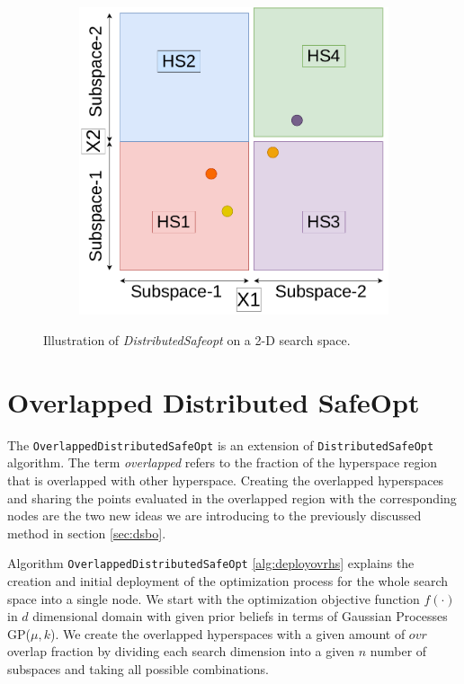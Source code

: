 \begin{figure}[H]
\begin{subfigure}{0.45\textwidth}
		\caption{}
		\label{fig:dsbo-f}
	\end{subfigure}
	\begin{subfigure}{0.45\textwidth}
		\centering
		\includegraphics[scale=0.33]{figures/dbo/dbo-07.pdf}
		\caption{}
		\label{fig:dsbo-g}
	\end{subfigure}
	\caption{Illustration of \textit{DistributedSafeopt} on a 2-D search space.}
	\label{fig:dsbo}
\end{figure}

\section{Overlapped Distributed SafeOpt}\label{sec:ovr-dsbo}
The \texttt{OverlappedDistributedSafeOpt} is an extension of \texttt{DistributedSafeOpt} algorithm. The term \textit{overlapped} refers to the fraction of the hyperspace region that is overlapped with other hyperspace. Creating the overlapped hyperspaces and sharing the points evaluated in the overlapped region with the corresponding nodes are the two new ideas we are introducing to the previously discussed method in section \ref{sec:dsbo}. 

Algorithm \texttt{OverlappedDistributedSafeOpt} \ref{alg:deployovrhs} explains the creation and initial deployment of the optimization process for the whole search space into a single node. 
We start with the optimization objective function $f(\cdot)$ in $d$ dimensional domain with given prior beliefs in terms of Gaussian Processes GP($\mu, k$). We create the overlapped hyperspaces with a given amount of $ovr$ overlap fraction by dividing each search dimension into a given $n$ number of subspaces and taking all possible combinations. 

